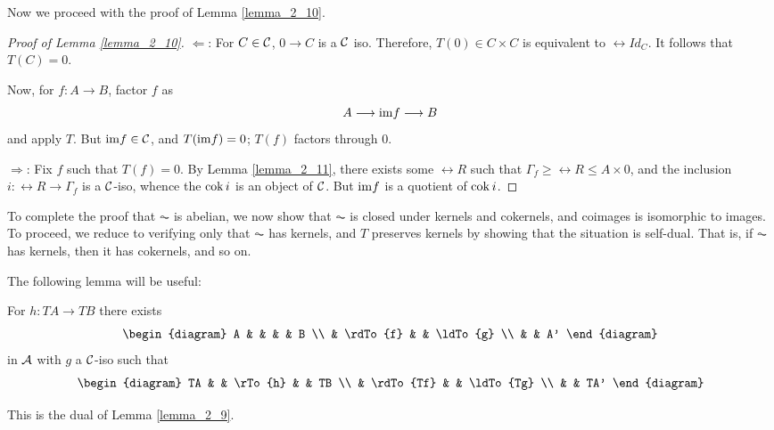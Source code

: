 Now we proceed with the proof of Lemma \ref{lemma_2_10}.

\begin{proof}[Proof of Lemma \ref{lemma_2_10}]
\noindent $\Leftarrow$: For $C \in \mathcal{C}$, $0 \to C$ is
a $\mathcal{C}$ iso. Therefore, $T(0) \in C \times C$ is
equivalent to $\rel{Id}_C$. It follows that $T(C) = 0$.

Now, for $f: A \to B$, factor $f$ as
\[
A \longrightarrow \mathrm{im} f \longrightarrow B
\]
and apply $T$. But $\mathrm{im} f \in \mathcal{C}$, and $T(\mathrm{im} f) = 0$; 
$T(f)$ factors through $0$.

\noindent $\Rightarrow$: Fix $f$ such that $T(f) = 0$. By Lemma 
\ref{lemma_2_11}, there exists some $\rel{R}$ such that 
$\Gamma_f \geq \rel{R} \leq A \times 0$, and the inclusion $i: 
\rel{R} \to \Gamma_f$ is a $\mathcal{C}$-iso, whence the $\mathrm{cok}\, i$ is 
an object of $\mathcal{C}$. But $\mathrm{im} f$ is a quotient of $\mathrm{cok}\, i$.
\end{proof}

To complete the proof that $\AC$ is abelian, we now show that 
$\AC$ is closed under kernels and cokernels, and coimages is 
isomorphic to images. To proceed, we reduce to verifying only 
that $\AC$ has kernels, and $T$ preserves kernels by showing that
the situation is self-dual. That is, if $\AC$ has kernels, then
it has cokernels, and so on.

The following lemma will be useful:

\begin{lem}
For $h: TA \to TB$ there exists
\[
\begin{diagram}
A &          &    &          & B \\
  & \rdTo{f} &    & \ldTo{g} \\
  &          & A'
\end{diagram}
\]
in $\mathcal{A}$ with $g$ a $\mathcal{C}$-iso such that
\[
\begin{diagram}
TA &           & \rTo{h} &           & TB \\
   & \rdTo{Tf} &         & \ldTo{Tg} \\
   &           & TA'
\end{diagram}
\]
\end{lem}

\begin{rmk}
This is the dual of Lemma \ref{lemma_2_9}.
\end{rmk}

